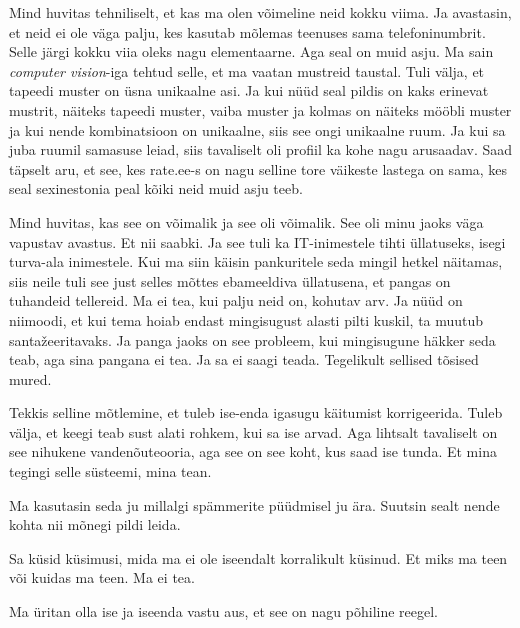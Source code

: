 
Mind huvitas tehniliselt, et kas ma olen võimeline neid kokku viima. Ja 
avastasin, et neid ei ole väga palju, kes kasutab mõlemas teenuses sama 
telefoninumbrit. Selle järgi kokku viia oleks nagu elementaarne. Aga seal on 
muid asju. Ma sain \emph{computer vision}-iga tehtud selle, et ma vaatan 
mustreid taustal. Tuli välja, et tapeedi muster on üsna unikaalne asi. Ja kui 
nüüd seal pildis on kaks erinevat mustrit, näiteks tapeedi muster, vaiba muster 
ja kolmas on näiteks  mööbli muster ja kui nende kombinatsioon on unikaalne, 
siis see ongi unikaalne ruum. Ja kui sa juba ruumil samasuse leiad, siis 
tavaliselt oli profiil ka kohe nagu arusaadav. Saad täpselt aru, et see, kes 
rate.ee-s  on nagu selline tore väikeste lastega on sama, kes seal sexinestonia 
peal kõiki neid muid asju teeb. 


Mind huvitas, kas see on võimalik ja see oli võimalik. See oli minu jaoks väga 
vapustav avastus. Et nii saabki. Ja see tuli ka IT-inimestele tihti üllatuseks, 
isegi turva-ala inimestele. Kui ma siin käisin  pankuritele seda mingil hetkel 
näitamas, siis neile tuli see just selles mõttes ebameeldiva üllatusena, et 
pangas on tuhandeid tellereid. Ma ei tea, kui palju neid on, kohutav arv. Ja 
nüüd on niimoodi, et kui tema hoiab endast mingisugust alasti pilti kuskil, ta 
muutub santažeeritavaks. Ja panga jaoks on see probleem, kui mingisugune häkker 
seda teab, aga sina pangana ei tea. Ja sa ei saagi  teada. Tegelikult sellised 
tõsised mured. 

Tekkis selline mõtlemine, et tuleb ise-enda igasugu käitumist korrigeerida. 
Tuleb välja, et keegi teab sust alati rohkem, kui sa ise arvad. Aga lihtsalt 
tavaliselt on see nihukene vandenõuteooria, aga see on see koht, kus saad ise 
tunda. Et mina tegingi selle süsteemi, mina tean. 

Ma kasutasin seda ju millalgi spämmerite püüdmisel ju ära. Suutsin sealt nende 
kohta nii mõnegi pildi leida.


Sa küsid küsimusi, mida ma ei ole iseendalt korralikult küsinud. Et miks ma 
teen või kuidas ma teen. Ma ei tea. 


Ma üritan olla ise ja iseenda vastu aus, et see on nagu põhiline reegel. 
